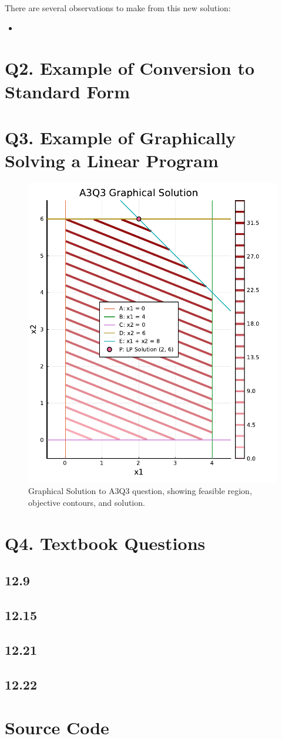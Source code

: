\documentclass{article}
\begin{document}
    There are several observations to make from this new solution:

    \begin{itemize}
        \item 
    \end{itemize}


    \section{Q2. Example of Conversion to Standard Form}

    \section{Q3. Example of Graphically Solving a Linear Program}

    \begin{figure}[H]
        \centering
        \includegraphics[width=0.5\linewidth]{A3Q3_Plot.pdf}
        \caption{Graphical Solution to A3Q3 question, showing feasible region, objective contours, and solution.}
        \label{fig:A3Q3_GraphicalSolution}
    \end{figure}

    \section{Q4. Textbook Questions}

    \subsection{12.9}

    \subsection{12.15}

    \subsection{12.21}

    \subsection{12.22}


    \newpage
    \appendix

    \section{Source Code}
\end{document}
